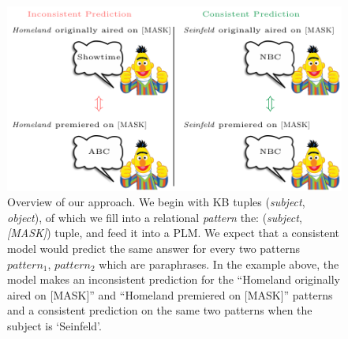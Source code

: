 \begin{figure}[t!]
\centering

\includegraphics[width=1.\columnwidth]{figures/overview}

\caption{Overview of our approach. We begin with KB tuples (\textit{subject}, \textit{object}), of which we fill into a relational \textit{pattern} the: (\textit{subject}, \textit{[MASK]}) tuple,
and feed it into a PLM. 
We expect that a consistent model would predict the same answer for every two patterns $pattern_1$, $pattern_2$ which are paraphrases. 
In the example above, the model makes an inconsistent prediction for the ``Homeland originally aired on [MASK]'' and ``Homeland premiered on [MASK]'' patterns and a consistent prediction on the same two patterns when the subject is `Seinfeld'.
}
\label{fig:overview}
\end{figure}


